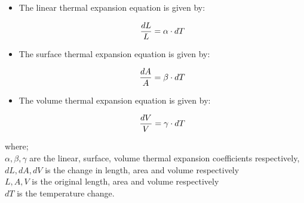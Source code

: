\documentclass[12pt,a4paper]{article}
\begin{document}
\begin{itemize}
    \item 
    The linear thermal expansion equation is given by:
    \vspace{6pt}
    \begin{center}
        \begin{tcolorbox}[width=10cm,colback=white]
            \begin{equation}
            \centering
            \frac{dL}{L} = \alpha \cdot {dT}
            \end{equation}
        \end{tcolorbox} 
    \end{center}
    \item 
    The surface thermal expansion equation is given by:
    \vspace{6pt}
    \begin{center}
        \begin{tcolorbox}[width=10cm,colback=white]
            \begin{equation}
            \centering
            \frac{dA}{A} = \beta \cdot {dT}
            \end{equation}
        \end{tcolorbox} 
    \end{center}
    \item 
    The volume thermal expansion equation is given by:
    \vspace{6pt}
    \begin{center}
        \begin{tcolorbox}[width=10cm,colback=white]
            \begin{equation}
            \centering
            \frac{dV}{V} = \gamma \cdot {dT}
            \end{equation}
        \end{tcolorbox} 
    \end{center}
\end{itemize}
where;\\ $\alpha, \beta, \gamma$ are the linear, surface, volume thermal expansion coefficients respectively, \\
$dL, dA, dV$ is the change in length, area and volume respectively \\
$L, A, V$ is the original length, area and volume respectively \\
$dT$ is the temperature change. 
\end{document}
